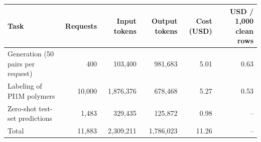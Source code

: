\begin{tabular}{@{}lrrrrr@{}}
\toprule
Task & Requests & Input tokens & Output tokens & Cost (USD) & USD / 1{,}000 clean rows \\
\midrule
Generation (50 pairs per request) & 400 & 103,400 & 981,683 & 5.01 & 0.63 \\
Labeling of PI1M polymers & 10,000 & 1,876,376 & 678,468 & 5.27 & 0.53 \\
Zero-shot test-set predictions & 1,483 & 329,435 & 125,872 & 0.98 & -- \\
\midrule
Total & 11,883 & 2,309,211 & 1,786,023 & 11.26 & -- \\
\bottomrule
\end{tabular}
